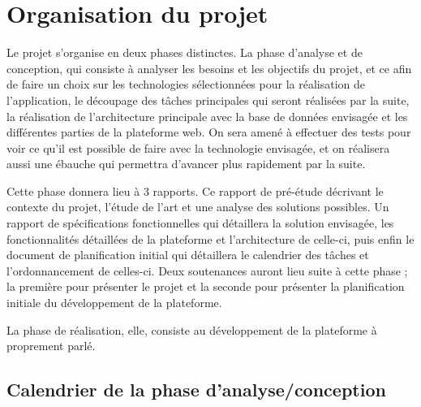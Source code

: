 \section{Organisation du projet}
\label{sec:organisation}
    Le projet s’organise en deux phases distinctes. La phase d’analyse et de conception, qui consiste
    à analyser les besoins et les objectifs du projet, et ce afin de faire un choix sur les technologies
    sélectionnées pour la réalisation de l’application, le découpage des tâches principales qui seront
    réalisées par la suite, la réalisation de l’architecture principale avec la base de données envisagée
    et les différentes parties de la plateforme web. On sera amené à effectuer des tests pour voir ce qu’il
    est possible de faire avec la technologie envisagée, et on réalisera aussi une ébauche qui permettra
    d’avancer plus rapidement par la suite.

    Cette phase donnera lieu à 3 rapports. Ce rapport de pré-étude décrivant le contexte du projet,
    l’étude de l’art et une analyse des solutions possibles. Un rapport de spécifications fonctionnelles
    qui détaillera la solution envisagée, les fonctionnalités détaillées de la plateforme et l’architecture
    de celle-ci, puis enfin le document de planification initial qui détaillera le calendrier des tâches et
    l’ordonnancement de celles-ci. Deux soutenances auront lieu suite à cette phase ; la première pour présenter
    le projet et la seconde pour présenter la planification initiale du développement de la plateforme.

    La phase de réalisation, elle, consiste au développement de la plateforme à proprement parlé.

    \subsection{Calendrier de la phase d’analyse/conception}
    \label{subsec:calendrier}

